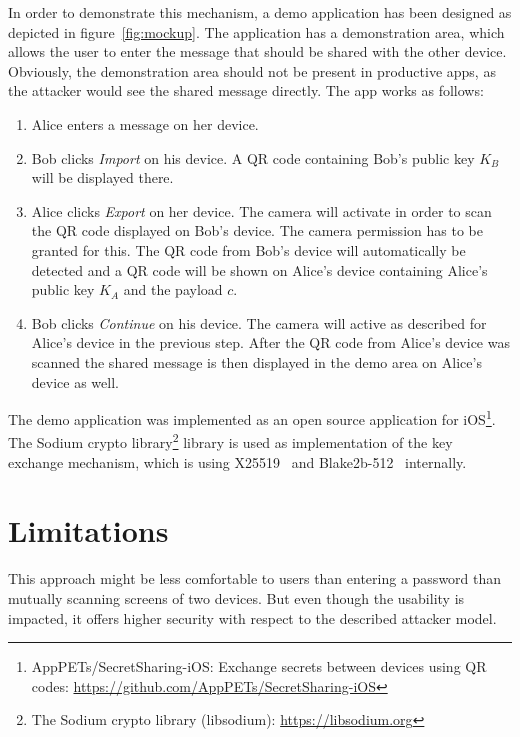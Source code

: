 In order to demonstrate this mechanism, a demo application has been designed as depicted in figure~\ref{fig:mockup}.
The application has a demonstration area, which allows the user to enter the message that should be shared with the other device.
Obviously, the demonstration area should not be present in productive apps, as the attacker would see the shared message directly.
The app works as follows:
\begin{enumerate}
	\item
		Alice enters a message on her device.
	\item
		Bob clicks \emph{Import} on his device.
		A QR code containing Bob's public key $K_B$ will be displayed there.
	\item
		Alice clicks \emph{Export} on her device.
		The camera will activate in order to scan the QR code displayed on Bob's device.
		The camera permission has to be granted for this.
		The QR code from Bob's device will automatically be detected and a QR code will be shown on Alice's device containing Alice's public key $K_A$ and the payload $c$.
	\item
		Bob clicks \emph{Continue} on his device.
		The camera will active as described for Alice's device in the previous step.
		After the QR code from Alice's device was scanned the shared message is then displayed in the demo area on Alice's device as well.
\end{enumerate}

The demo application was implemented as an open source application for iOS\footnote{AppPETs/SecretSharing-iOS: Exchange secrets between devices using QR codes: \url{https://github.com/AppPETs/SecretSharing-iOS}}.
The Sodium crypto library\footnote{The Sodium crypto library (libsodium): \url{https://libsodium.org}} library is used as implementation of the key exchange mechanism, which is using X25519~\cite{DBLP:journals/rfc/rfc7748} and Blake2b-512~\cite{Aumasson:2013, DBLP:journals/rfc/rfc7693, Aumasson:2016} internally.


\section{Limitations}

This approach might be less comfortable to users than entering a password than mutually scanning screens of two devices.
But even though the usability is impacted, it offers higher security with respect to the described attacker model.


